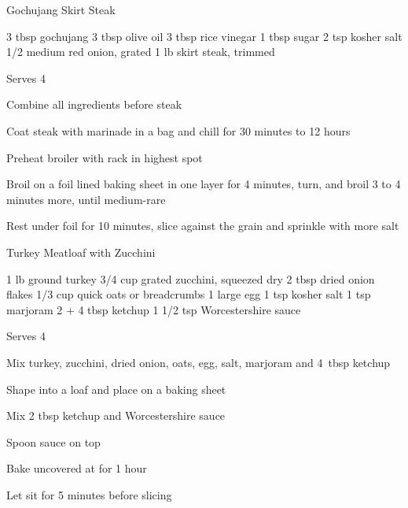 \begin{recipe}{Gochujang Skirt Steak}{}
\begin{ingredients}
3 tbsp gochujang
3 tbsp olive oil
3 tbsp rice vinegar
1 tbsp sugar
2 tsp kosher salt
1/2 medium red onion, grated
1 lb skirt steak, trimmed
\end{ingredients}
\nextcolumn
Serves 4
\begin{steps}
    \item Combine all ingredients before steak
    \item Coat steak with marinade in a bag and chill for 30 minutes to 12 hours
    \item Preheat broiler with rack in highest spot
    \item Broil on a foil lined baking sheet in one layer for 4 minutes, turn, and broil 3 to 4 minutes more, until medium-rare
    \item Rest under foil for 10 minutes, slice against the grain and sprinkle with more salt
\end{steps}
\end{recipe}

\begin{denserecipe}{Turkey Meatloaf with Zucchini}{}
\begin{ingredients}
1 lb ground turkey
3/4 cup grated zucchini, squeezed dry
2 tbsp dried onion flakes
1/3 cup quick oats or breadcrumbs
1 large egg
1 tsp kosher salt
1 tsp marjoram
2 + 4 tbsp ketchup
1 1/2 tsp Worcestershire sauce
\end{ingredients}
\nextcolumn
Serves 4
\begin{steps}
\item Mix turkey, zucchini, dried onion, oats, egg, salt, marjoram and 4~tbsp ketchup
\item Shape into a loaf and place on a baking sheet
\item Mix 2 tbsp ketchup and Worcestershire sauce
\item Spoon sauce on top
\item Bake uncovered at  for 1 hour
\item Let sit for 5 minutes before slicing
\end{steps}
\end{denserecipe}

